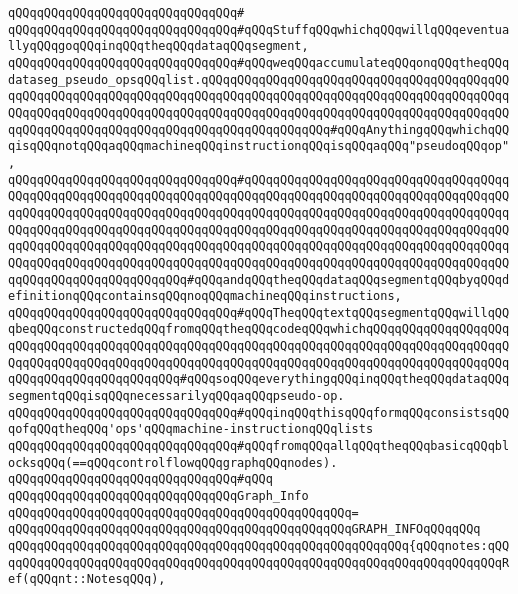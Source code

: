 \verb|qQQqqQQqqQQqqQQqqQQqqQQqqQQqqQQq#|\newline
\verb|qQQqqQQqqQQqqQQqqQQqqQQqqQQqqQQq#qQQqStuffqQQqwhichqQQqwillqQQqeventuallyqQQqgoqQQqinqQQqtheqQQqdataqQQqsegment,|\newline
\verb|qQQqqQQqqQQqqQQqqQQqqQQqqQQqqQQq#qQQqweqQQqaccumulateqQQqonqQQqtheqQQqdataseg_pseudo_opsqQQqlist.qQQqqQQqqQQqqQQqqQQqqQQqqQQqqQQqqQQqqQQqqQQqqQQqqQQqqQQqqQQqqQQqqQQqqQQqqQQqqQQqqQQqqQQqqQQqqQQqqQQqqQQqqQQqqQQqqQQqqQQqqQQqqQQqqQQqqQQqqQQqqQQqqQQqqQQqqQQqqQQqqQQqqQQqqQQqqQQqqQQqqQQqqQQqqQQqqQQqqQQqqQQqqQQqqQQqqQQqqQQqqQQqqQQq#qQQqAnythingqQQqwhichqQQqisqQQqnotqQQqaqQQqmachineqQQqinstructionqQQqisqQQqaqQQq"pseudoqQQqop",|\newline
\verb|qQQqqQQqqQQqqQQqqQQqqQQqqQQqqQQq#qQQqqQQqqQQqqQQqqQQqqQQqqQQqqQQqqQQqqQQqqQQqqQQqqQQqqQQqqQQqqQQqqQQqqQQqqQQqqQQqqQQqqQQqqQQqqQQqqQQqqQQqqQQqqQQqqQQqqQQqqQQqqQQqqQQqqQQqqQQqqQQqqQQqqQQqqQQqqQQqqQQqqQQqqQQqqQQqqQQqqQQqqQQqqQQqqQQqqQQqqQQqqQQqqQQqqQQqqQQqqQQqqQQqqQQqqQQqqQQqqQQqqQQqqQQqqQQqqQQqqQQqqQQqqQQqqQQqqQQqqQQqqQQqqQQqqQQqqQQqqQQqqQQqqQQqqQQqqQQqqQQqqQQqqQQqqQQqqQQqqQQqqQQqqQQqqQQqqQQqqQQqqQQqqQQqqQQqqQQqqQQqqQQqqQQqqQQqqQQqqQQqqQQqqQQq#qQQqandqQQqtheqQQqdataqQQqsegmentqQQqbyqQQqdefinitionqQQqcontainsqQQqnoqQQqmachineqQQqinstructions,|\newline
\verb|qQQqqQQqqQQqqQQqqQQqqQQqqQQqqQQq#qQQqTheqQQqtextqQQqsegmentqQQqwillqQQqbeqQQqconstructedqQQqfromqQQqtheqQQqcodeqQQqwhichqQQqqQQqqQQqqQQqqQQqqQQqqQQqqQQqqQQqqQQqqQQqqQQqqQQqqQQqqQQqqQQqqQQqqQQqqQQqqQQqqQQqqQQqqQQqqQQqqQQqqQQqqQQqqQQqqQQqqQQqqQQqqQQqqQQqqQQqqQQqqQQqqQQqqQQqqQQqqQQqqQQqqQQqqQQqqQQqqQQqqQQq#qQQqsoqQQqeverythingqQQqinqQQqtheqQQqdataqQQqsegmentqQQqisqQQqnecessarilyqQQqaqQQqpseudo-op.|\newline
\verb|qQQqqQQqqQQqqQQqqQQqqQQqqQQqqQQq#qQQqinqQQqthisqQQqformqQQqconsistsqQQqofqQQqtheqQQq'ops'qQQqmachine-instructionqQQqlists|\newline
\verb|qQQqqQQqqQQqqQQqqQQqqQQqqQQqqQQq#qQQqfromqQQqallqQQqtheqQQqbasicqQQqblocksqQQq(==qQQqcontrolflowqQQqgraphqQQqnodes).|\newline
\verb|qQQqqQQqqQQqqQQqqQQqqQQqqQQqqQQq#qQQq|\newline
\verb|qQQqqQQqqQQqqQQqqQQqqQQqqQQqqQQqGraph_Info|\newline
\verb|qQQqqQQqqQQqqQQqqQQqqQQqqQQqqQQqqQQqqQQqqQQqqQQq=|\newline
\verb|qQQqqQQqqQQqqQQqqQQqqQQqqQQqqQQqqQQqqQQqqQQqqQQqGRAPH_INFOqQQqqQQq|\newline
\verb|qQQqqQQqqQQqqQQqqQQqqQQqqQQqqQQqqQQqqQQqqQQqqQQqqQQqqQQq{qQQqnotes:qQQqqQQqqQQqqQQqqQQqqQQqqQQqqQQqqQQqqQQqqQQqqQQqqQQqqQQqqQQqqQQqqQQqqQQqRef(qQQqnt::NotesqQQq),|\newline
